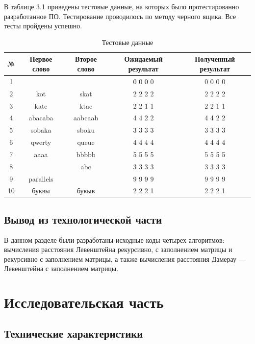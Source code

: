 \documentclass[12pt]{report}
\begin{document}
В таблице 3.1 приведены тестовые данные, на которых было протестированно разработанное ПО. Тестирование проводилось по методу черного ящика. Все тесты пройдены успешно.
\begin{table}[hp!]
	\begin{center}
		\caption{Тестовые данные}
		\newline
		\begin{tabular}{|c c c c c|} 
			\hline
			№ & Первое слово & Второе слово & Ожидаемый результат & Полученный результат \\ [0.8ex] 
			\hline
			1 &  &  & 0 0 0 0 & 0 0 0 0\\
			\hline
			2 & kot & skat & 2 2 2 2 & 2 2 2 2\\
			\hline
			3 & kate & ktae & 2 2 1 1 & 2 2 1 1\\
			\hline
			4 & abacaba & aabcaab & 4 4 2 2 & 4 4 2 2\\
			\hline
			5 & sobaka & sboku & 3 3 3 3 & 3 3 3 3\\
			\hline
			6 & qwerty & queue & 4 4 4 4 & 4 4 4 4\\
			\hline
			7 & aaaa & bbbbb & 5 5 5 5  & 5 5 5 5\\
			\hline
			8 &  & abc & 3 3 3 3 & 3 3 3 3\\
			\hline
			9 & parallels &  & 9 9 9 9 & 9 9 9 9\\
			\hline
			10 & буквы & букыв & 2 2 2 1 & 2 2 2 1\\
			\hline
		\end{tabular}
	\end{center}
\end{table}
\newline

\section{Вывод из технологической части}
В данном разделе были разработаны исходные коды четырех алгоритмов: вычисления расстояния Левенштейна рекурсивно, с заполнением матрицы и рекурсивно с заполнением матрицы, а также вычисления расстояния Дамерау — Левенштейна с заполнением матрицы.

\chapter{Исследовательская часть}

\section{Технические характеристики}
\end{document}
